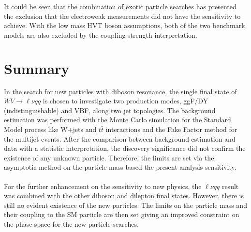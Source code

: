 \noindent
\\
\\It could be seen that the combination of exotic particle searches has presented the exclusion that the electroweak measurements did not have the sensitivity to achieve. With the low mass HVT boson assumptions, both of the two benchmark models are also excluded by the coupling strength interpretation.
\section{Summary}
In the search for new particles with diboson resonance, the single final state of $WV\to\ell\nu qq$ is chosen to investigate two production modes, ggF/DY (indistinguishable) and VBF, along two jet topologies. The background estimation was performed with the Monte Carlo simulation for the Standard Model process like W+jets and $t\bar{t}$ interactions and the Fake Factor method for the multijet events. After the comparison between background estimation and data with a statistic interpretation, the discovery significance did not confirm the existence of any unknown particle. Therefore, the limits are set via the asymptotic method on the particle mass based the present analysis sensitivity. 
\\
\\For the further enhancement on the sensitivity to new physics, the $\ell\nu qq$ result was combined with the other diboson and dilepton final states. However, there is still no evident existence of the new particles. The limits on the particle mass and their coupling to the SM particle are then set giving an improved constraint on the phase space for the new particle searches.  